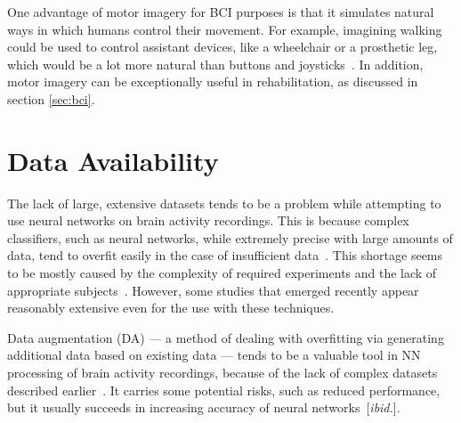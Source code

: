 \documentclass[english, he, bc, kiv, iso690alph, viewonly]{fasthesis}
\begin{document}

One advantage of motor imagery for BCI purposes is that it simulates natural ways in which humans control their movement. For example, imagining walking could be used to control assistant devices, like a wheelchair or a prosthetic leg, which would be a lot more natural than buttons and joysticks~\cite{he:bci:legs:18}. In addition, motor imagery can be exceptionally useful in rehabilitation, as discussed in section \ref{sec:bci}.

\section{Data Availability}

The lack of large, extensive datasets tends to be a problem while attempting to use neural networks on brain activity recordings. This is because complex classifiers, such as neural networks, while extremely precise with large amounts of data, tend to overfit easily in the case of insufficient data~\cite{domingos:ml:12}. This shortage seems to be mostly caused by the complexity of required experiments and the lack of appropriate subjects~\cite{he:da:21}. However, some studies that emerged recently appear reasonably extensive even for the use with these techniques.

Data augmentation (DA) --- a method of dealing with overfitting via generating additional data based on existing data --- tends to be a valuable tool in NN processing of brain activity recordings, because of the lack of complex datasets described earlier~\cite{he:da:21}. It carries some potential risks, such as reduced performance, but it usually succeeds in increasing accuracy of neural networks~[\emph{ibid.}].
\end{document}
